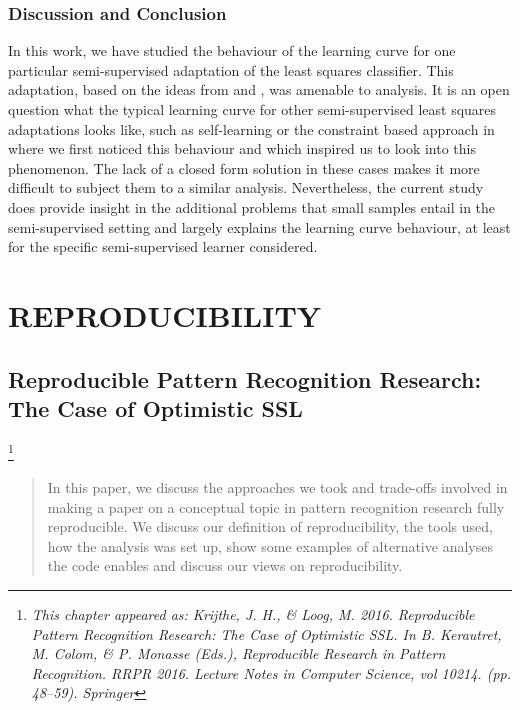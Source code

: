 \documentclass[twoside]{memoir}\usepackage[]{graphicx}\usepackage{xcolor}
\newcommand\blfootnote[1]{%
  \begingroup
  \renewcommand\thefootnote{}\footnote{\itshape#1}%
  \addtocounter{footnote}{-1}%
  \endgroup
}
\newcommand{\mypartpic}{cover/part2.pdf}
\newcommand\PartPic{
\checkoddpage
\ifoddpage
\put(\LenToUnit{-1mm},\LenToUnit{0mm}){
\texttt{[image: \\mypartpic]}
}
\fi
}
\begin{document}
\section{Discussion and Conclusion}
In this work, we have studied the behaviour of the learning curve for one particular semi-supervised adaptation of the least squares classifier. This adaptation, based on the ideas from \citet{Shaffer1991} and \citet{Fan2008}, was amenable to analysis. It is an open question what the typical learning curve for other semi-supervised least squares adaptations looks like, such as self-learning or the constraint based approach in \citet{Krijthe2015} where we first noticed this behaviour and which inspired us to look into this phenomenon. The lack of a closed form solution in these cases makes it more difficult to subject them to a similar analysis.  Nevertheless, the current study does provide insight in the additional problems that small samples entail in the semi-supervised setting and largely explains the learning curve behaviour, at least for the specific semi-supervised learner considered.
\cleartoverso
\null
\thispagestyle{empty}
\afterpage{\restorepagecolor}
\newpage
\renewcommand{\mypartpic}{cover/part3.pdf}
\AddToShipoutPicture{\PartPic}
\part{REPRODUCIBILITY}
\ClearShipoutPicture

\chapter[Reproducible Pattern Recognition Research]{Reproducible Pattern Recognition Research:\\The Case of Optimistic SSL}
\label{chapter:reproducing}
\blfootnote{This chapter appeared as: Krijthe, J. H., \& Loog, M. 2016. Reproducible Pattern Recognition Research: The Case of Optimistic SSL. In B. Kerautret, M. Colom, \& P. Monasse (Eds.), Reproducible Research in Pattern Recognition. RRPR 2016. Lecture Notes in Computer Science, vol 10214. (pp. 48–59). Springer}


\begin{abstract}
In this paper, we discuss the approaches we took and trade-offs involved in making a paper on a conceptual topic in pattern recognition research fully reproducible. We discuss our definition of reproducibility, the tools used, how the analysis was set up, show some examples of alternative analyses the code enables and discuss our views on reproducibility.
\end{abstract}
\end{document}
